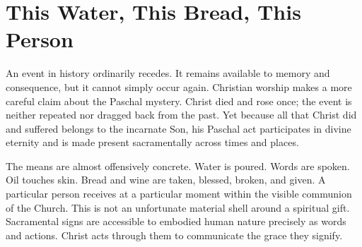 \section{This Water, This Bread, This Person}

An event in history ordinarily recedes. It remains available to memory and consequence, but it cannot simply occur again. Christian worship makes a more careful claim about the Paschal mystery. Christ died and rose once; the event is neither repeated nor dragged back from the past. Yet because all that Christ did and suffered belongs to the incarnate Son, his Paschal act participates in divine eternity and is made present sacramentally across times and places.

The means are almost offensively concrete. Water is poured. Words are spoken. Oil touches skin. Bread and wine are taken, blessed, broken, and given. A particular person receives at a particular moment within the visible communion of the Church. This is not an unfortunate material shell around a spiritual gift. Sacramental signs are accessible to embodied human nature precisely as words and actions. Christ acts through them to communicate the grace they signify.

